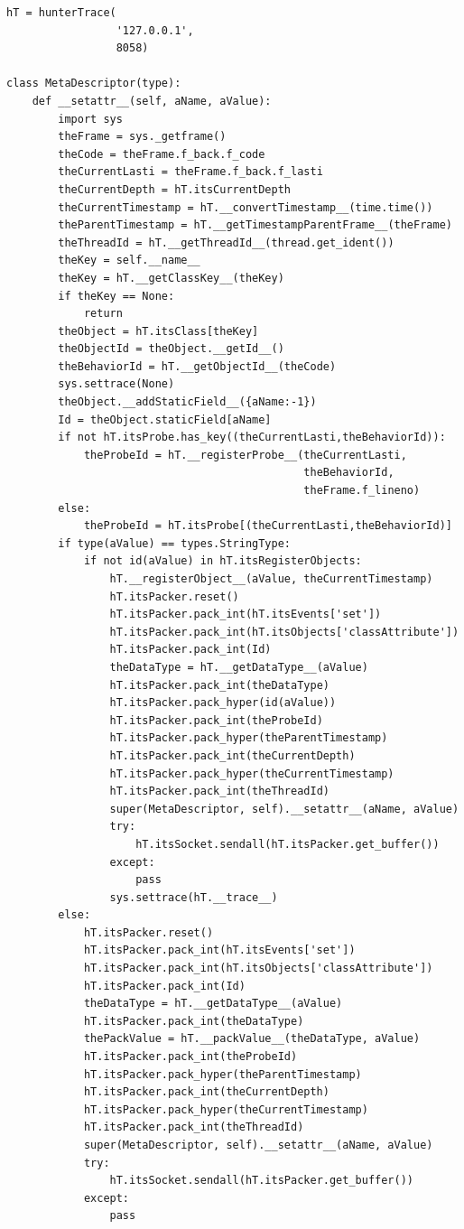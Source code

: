 \documentclass[12pt,legalpaper]{report}
\begin{document}
\begin{singlespace}
\begin{lstlisting}[style=Python]
hT = hunterTrace(
                 '127.0.0.1',
                 8058)

class MetaDescriptor(type):
    def __setattr__(self, aName, aValue):
        import sys
        theFrame = sys._getframe()
        theCode = theFrame.f_back.f_code
        theCurrentLasti = theFrame.f_back.f_lasti
        theCurrentDepth = hT.itsCurrentDepth
        theCurrentTimestamp = hT.__convertTimestamp__(time.time())
        theParentTimestamp = hT.__getTimestampParentFrame__(theFrame)
        theThreadId = hT.__getThreadId__(thread.get_ident())
        theKey = self.__name__
        theKey = hT.__getClassKey__(theKey)
        if theKey == None:
            return
        theObject = hT.itsClass[theKey]
        theObjectId = theObject.__getId__()
        theBehaviorId = hT.__getObjectId__(theCode)
        sys.settrace(None)
        theObject.__addStaticField__({aName:-1})
        Id = theObject.staticField[aName]
        if not hT.itsProbe.has_key((theCurrentLasti,theBehaviorId)):
            theProbeId = hT.__registerProbe__(theCurrentLasti,
                                              theBehaviorId,
                                              theFrame.f_lineno)
        else:
            theProbeId = hT.itsProbe[(theCurrentLasti,theBehaviorId)]          
        if type(aValue) == types.StringType:
            if not id(aValue) in hT.itsRegisterObjects:
                hT.__registerObject__(aValue, theCurrentTimestamp)
                hT.itsPacker.reset()
                hT.itsPacker.pack_int(hT.itsEvents['set'])
                hT.itsPacker.pack_int(hT.itsObjects['classAttribute'])
                hT.itsPacker.pack_int(Id)
                theDataType = hT.__getDataType__(aValue)
                hT.itsPacker.pack_int(theDataType)
                hT.itsPacker.pack_hyper(id(aValue))
                hT.itsPacker.pack_int(theProbeId)
                hT.itsPacker.pack_hyper(theParentTimestamp)        
                hT.itsPacker.pack_int(theCurrentDepth)
                hT.itsPacker.pack_hyper(theCurrentTimestamp)
                hT.itsPacker.pack_int(theThreadId)
                super(MetaDescriptor, self).__setattr__(aName, aValue)
                try:
                    hT.itsSocket.sendall(hT.itsPacker.get_buffer())
                except:
                    pass    
                sys.settrace(hT.__trace__)
        else:
            hT.itsPacker.reset()
            hT.itsPacker.pack_int(hT.itsEvents['set'])
            hT.itsPacker.pack_int(hT.itsObjects['classAttribute'])
            hT.itsPacker.pack_int(Id)
            theDataType = hT.__getDataType__(aValue)
            hT.itsPacker.pack_int(theDataType)
            thePackValue = hT.__packValue__(theDataType, aValue)
            hT.itsPacker.pack_int(theProbeId)
            hT.itsPacker.pack_hyper(theParentTimestamp)        
            hT.itsPacker.pack_int(theCurrentDepth)
            hT.itsPacker.pack_hyper(theCurrentTimestamp)
            hT.itsPacker.pack_int(theThreadId)
            super(MetaDescriptor, self).__setattr__(aName, aValue)
            try:
                hT.itsSocket.sendall(hT.itsPacker.get_buffer())
            except:
                pass    
        


\end{lstlisting}
\end{singlespace}
\end{document}
